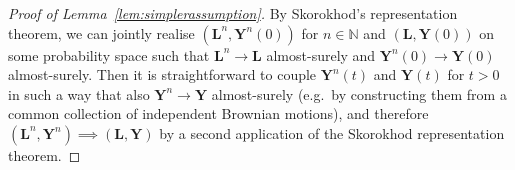 \documentclass[reqno,draft]{amsart}
\numberwithin{equation}{section}
\theoremstyle{plain}
\theoremstyle{remark}
\newcommand{\N}{\mathbb{N}} %
\begin{document}
\begin{proof}[Proof of Lemma~\ref{lem:simplerassumption}]
    By Skorokhod's representation theorem, we can jointly realise $(\boldsymbol L^n,\boldsymbol Y^n(0))$ for $n\in \N$ and $(\boldsymbol L, \boldsymbol Y(0))$ on some probability space such that $\boldsymbol L^n \to \boldsymbol L$ almost-surely and $\boldsymbol Y^n(0) \to \boldsymbol Y(0)$ almost-surely. Then it is straightforward to couple $\boldsymbol Y^n(t)$ and $\boldsymbol Y(t)$ for $t > 0$ in such a way that also $\boldsymbol Y^n \to \boldsymbol Y$ almost-surely (e.g.\ by constructing them from a common collection of independent Brownian motions), and therefore $(\boldsymbol L^n,\boldsymbol Y^n) \implies (\boldsymbol L,\boldsymbol Y) $ by a second application of the Skorokhod representation theorem.
\end{proof}
\end{document}
